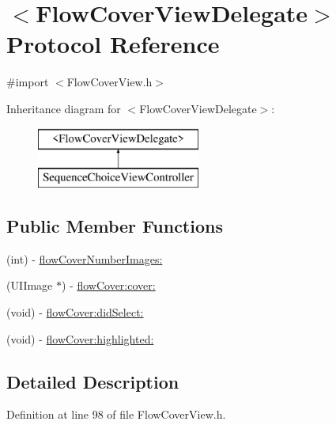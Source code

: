 \hypertarget{protocol_flow_cover_view_delegate-p}{
\section{$<$FlowCoverViewDelegate$>$ Protocol Reference}
\label{protocol_flow_cover_view_delegate-p}
}


{\ttfamily \#import $<$FlowCoverView.h$>$}

Inheritance diagram for $<$FlowCoverViewDelegate$>$:\begin{figure}[H]
\begin{center}
\leavevmode
\includegraphics[height=2.000000cm]{protocol_flow_cover_view_delegate-p}
\end{center}
\end{figure}
\subsection*{Public Member Functions}
\begin{DoxyCompactItemize}
\item 
(int) -\/ \hyperlink{protocol_flow_cover_view_delegate-p_a903f3604c343db8bf35359025b132c68}{flowCoverNumberImages:}
\item 
(UIImage $\ast$) -\/ \hyperlink{protocol_flow_cover_view_delegate-p_a3f65d485eeb1d3e06c4b368affb347cf}{flowCover:cover:}
\item 
(void) -\/ \hyperlink{protocol_flow_cover_view_delegate-p_ac39c531e826766d2d63f95f41a8f61c8}{flowCover:didSelect:}
\item 
(void) -\/ \hyperlink{protocol_flow_cover_view_delegate-p_a22d3e189827e56cdae2be089cba74fb3}{flowCover:highlighted:}
\end{DoxyCompactItemize}


\subsection{Detailed Description}


Definition at line 98 of file FlowCoverView.h.



